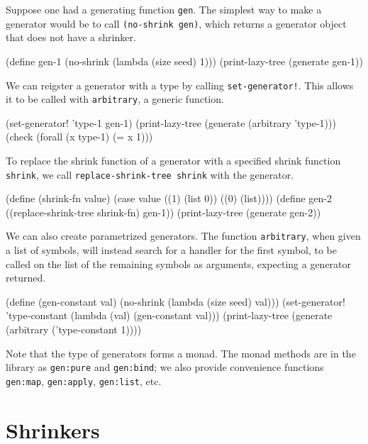 \documentclass{scrartcl}
\begin{document}
Suppose one had a generating function \verb|gen|. The simplest way to make a
generator would be to call \verb|(no-shrink gen)|, which returns a generator
object that does not have a shrinker.

\begin{verb}
(define gen-1 (no-shrink (lambda (size seed) 1)))
(print-lazy-tree (generate gen-1))
\end{verb}

We can reigster a generator with a type by calling \verb|set-generator!|. This
allows it to be called with \verb|arbitrary|, a generic function.

\begin{verb}
(set-generator! 'type-1 gen-1)
(print-lazy-tree (generate (arbitrary 'type-1)))
(check (forall (x type-1) (= x 1)))
\end{verb}

To replace the shrink function of a generator with a specified shrink function
\verb|shrink|, we call \verb|replace-shrink-tree shrink| with the generator.

\begin{verb}
(define (shrink-fn value) (case value ((1) (list 0)) ((0) (list))))
(define gen-2 ((replace-shrink-tree shrink-fn) gen-1))
(print-lazy-tree (generate gen-2))
\end{verb}

We can also create parametrized generators. The function \verb|arbitrary|, when
given a list of symbols, will instead search for a handler for the first symbol,
to be called on the list of the remaining symbols as arguments, expecting a
generator returned.

\begin{verb}
(define (gen-constant val) (no-shrink (lambda (size seed) val)))
(set-generator! 'type-constant (lambda (val) (gen-constant val)))
(print-lazy-tree (generate (arbitrary ('type-constant 1))))
\end{verb}

Note that the type of generators forms a monad. The monad methods are in the
library as \verb|gen:pure| and \verb|gen:bind|; we also provide convenience
functions \verb|gen:map|, \verb|gen:apply|, \verb|gen:list|, etc.

\section{Shrinkers}

\end{document}
